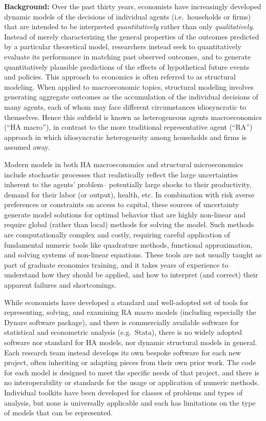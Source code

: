 \documentclass[12pt,pdftex,letterpaper]{article}
\begin{document}
\vspace{0.5cm}

\noindent \textbf{Background:} Over the past thirty years, economists have increasingly developed dynamic models of the decisions of individual agents (i.e.\ households or firms) that are intended to be interpreted \textit{quantitatively} rather than only \textit{qualitatively}. Instead of merely characterizing the general properties of the outcomes predicted by a particular theoretical model, researchers instead seek to quantitatively evaluate its performance in matching past observed outcomes, and to generate quantitatively plausible predictions of the effects of hypothetical future events and policies. This approach to economics is often referred to as structural modeling. When applied to macroeconomic topics, structural modeling involves generating aggregate outcomes as the accumulation of the individual decisions of many agents, each of whom may face different circumstances idiosyncratic to themselves. Hence this subfield is known as heterogeneous agents macroeconomics (``HA macro''), in contrast to the more traditional representative agent (``RA'') approach in which idiosyncratic heterogeneity among households and firms is assumed away.

Modern models in both HA macroeconomics and structural microeconomics include stochastic processes that realistically reflect the large uncertainties inherent to the agents' problem-- potentially large shocks to their productivity, demand for their labor (or output), health, etc. In combination with risk averse preferences or constraints on access to capital, these sources of uncertainty generate model solutions for optimal behavior that are highly non-linear and require global (rather than local) methods for solving the model. Such methods are computationally complex and costly, requiring careful application of fundamental numeric tools like quadrature methods, functional approximation, and solving systems of non-linear equations. These tools are not usually taught as part of graduate economics training, and it takes years of experience to understand how they should be applied, and how to interpret (and correct) their apparent failures and shortcomings.

While economists have developed a standard and well-adopted set of tools for representing, solving, and examining RA macro models (including especially the Dynare software package), and there is commercially available software for statistical and econometric analysis (e.g.\ Stata), there is no widely adopted software nor standard for HA models, nor dynamic structural models in general. Each research team instead develops its own bespoke software for each new project, often inheriting or adapting pieces from their own prior work. The code for each model is designed to meet the specific needs of that project, and there is no interoperability or standards for the usage or application of numeric methods. Individual toolkits have been developed for classes of problems and types of analysis, but none is universally applicable and each has limitations on the type of models that can be represented.
\end{document}
